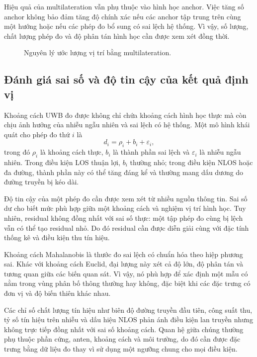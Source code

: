 \documentclass[
  a4paper,
]{report}
\begin{document}
Hiệu quả của multilateration vẫn phụ thuộc vào hình học anchor. Việc tăng số
anchor không bảo đảm tăng độ chính xác nếu các anchor tập trung trên cùng một
hướng hoặc nếu các phép đo bổ sung có sai lệch hệ thống. Vì vậy, số lượng,
chất lượng phép đo và độ phân tán hình học cần được xem xét đồng thời.

\begin{figure}[H]
  \centering
  \caption{Nguyên lý ước lượng vị trí bằng multilateration.}
  \label{fig:multilateration-concept}
\end{figure}

\subsection{Đánh giá sai số và độ tin cậy của kết quả định vị}

Khoảng cách UWB đo được không chỉ chứa khoảng cách hình học thực mà còn chịu
ảnh hưởng của nhiễu ngẫu nhiên và sai lệch có hệ thống. Một mô hình khái quát
cho phép đo thứ $i$ là
\begin{equation}
  d_i=\rho_i+b_i+\varepsilon_i,
  \label{eq:ranging-error-model}
\end{equation}
trong đó $\rho_i$ là khoảng cách thực, $b_i$ là thành phần sai lệch và
$\varepsilon_i$ là nhiễu ngẫu nhiên. Trong điều kiện LOS thuận lợi,
$b_i$ thường nhỏ; trong điều kiện NLOS hoặc đa đường, thành phần này có thể
tăng đáng kể và thường mang dấu dương do đường truyền bị kéo dài.

Độ tin cậy của một phép đo cần được xem xét từ nhiều nguồn thông tin. Sai số
dư cho biết mức phù hợp giữa một khoảng cách và nghiệm vị trí hình học. Tuy
nhiên, residual không đồng nhất với sai số thực: một tập phép đo cùng bị lệch
vẫn có thể tạo residual nhỏ. Do đó residual cần được diễn giải cùng với đặc
tính thống kê và điều kiện thu tín hiệu.

Khoảng cách Mahalanobis là thước đo sai lệch có chuẩn hóa theo hiệp phương
sai. Khác với khoảng cách Euclid, đại lượng này xét cả độ lớn, độ phân tán và
tương quan giữa các biến quan sát. Vì vậy, nó phù hợp để xác định một mẫu có
nằm trong vùng phân bố thông thường hay không, đặc biệt khi các đặc trưng có
đơn vị và độ biến thiên khác nhau.

Các chỉ số chất lượng tín hiệu như biên độ đường truyền đầu tiên, công suất
thu, tỷ số tín hiệu trên nhiễu và dấu hiệu NLOS phản ánh điều kiện lan truyền
nhưng không trực tiếp đồng nhất với sai số khoảng cách. Quan hệ giữa chúng
thường phụ thuộc phần cứng, anten, khoảng cách và môi trường, do đó cần được
đặc trưng bằng dữ liệu đo thay vì sử dụng một ngưỡng chung cho mọi điều kiện.
\end{document}
